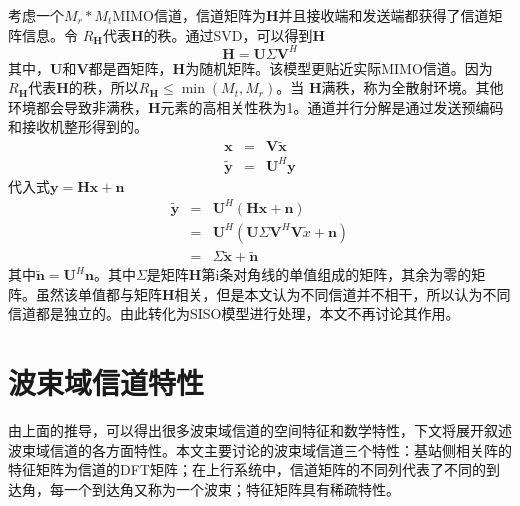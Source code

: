 \documentclass[bachelor,nocolorlinks, printoneside]{seuthesis} %
\begin{document}
\begin{Main}
考虑一个$ M_{r}* M_{t}$MIMO信道，信道矩阵为$\mathbf{H}$并且接收端和发送端都获得了信道矩阵信息。令 $ R_{\mathbf{H}}$代表$\mathbf{H}$的秩。通过SVD，可以得到$\mathbf{H}$
\begin{equation}\label{key}
\mathbf{H}=\mathbf{U}\Sigma\mathbf{V}^{H}
\end{equation}
其中，$\mathbf{U} $和$\mathbf{V} $都是酉矩阵，$\mathbf{H}$为随机矩阵。该模型更贴近实际MIMO信道。因为$ R_{\mathbf{H}}$代表$\mathbf{H}$的秩，所以$ R_{\mathbf{H}} \leq \min(M_{t},M_{r})$。当
$\mathbf{H}$满秩，称为全散射环境。其他环境都会导致非满秩，$\mathbf{H}$元素的高相关性秩为1。通道并行分解是通过发送预编码和接收机整形得到的。
\begin{eqnarray}\label{key}
\mathbf{x} &=& \mathbf{V}\tilde{\mathbf{x}}  \nonumber\\
\tilde{\mathbf{y}}&=& \mathbf{U}^{H}\mathbf{y}  \nonumber
\end{eqnarray}
代入式$\mathbf{y} = \mathbf{H}\mathbf{x}+\mathbf{n}$
\begin{eqnarray}\label{key}
\tilde{\mathbf{y}} & = &\mathbf{U}^{H}(\mathbf{H}\mathbf{x}+\mathbf{n}) {} \nonumber\\
& = & \mathbf{U}^{H}(\mathbf{U}\Sigma\mathbf{V}^{H}\mathbf{V}\tilde{x}+\mathbf{n}) \nonumber \\
& = & \Sigma\tilde{\mathbf{x}} + \tilde{\mathbf{n}}
\end{eqnarray}
其中$\tilde{\mathbf{n}}=\mathbf{U}^{H}\mathbf{n}$。其中$\Sigma$是矩阵$ \mathbf{H}$第i条对角线的单值组成的矩阵，其余为零的矩阵。虽然该单值都与矩阵$ \mathbf{H}$相关，但是本文认为不同信道并不相干，所以认为不同信道都是独立的。由此转化为SISO模型进行处理，本文不再讨论其作用。



\section{波束域信道特性}
由上面的推导，可以得出很多波束域信道的空间特征和数学特性，下文将展开叙述波束域信道的各方面特性。本文主要讨论的波束域信道三个特性：基站侧相关阵的特征矩阵为信道的DFT矩阵；在上行系统中，信道矩阵的不同列代表了不同的到达角，每一个到达角又称为一个波束；特征矩阵具有稀疏特性。\cite{SunboAngle}\cite{Youli1}\cite{Youli2}


\end{Main}
\end{document}

